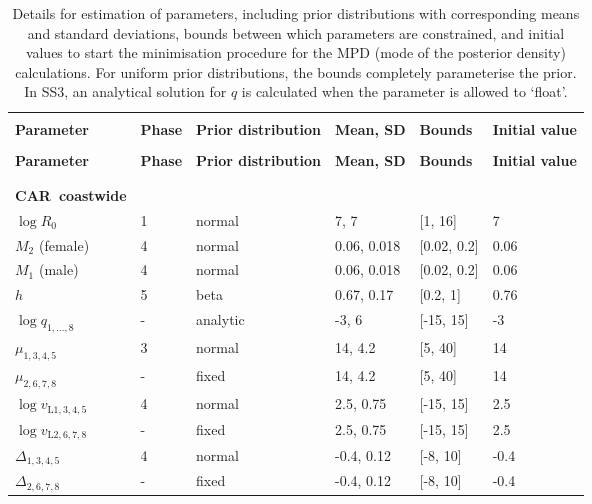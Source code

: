 \documentclass[11pt]{book}
\def\bfTh{{\bf \Theta}}%
\newcommand{\comment}[1]{}                    %
\def\bfTh{{\bf \Theta}}          %
\newcommand{\eref}[1]{(\ref{#1})}
\begin{document}

\begin{longtable}{L{1.2in}C{1.0in}C{1.0in}C{1.0in}C{1.0in}C{1.2in}}
\caption{Details for estimation of parameters, including prior distributions with corresponding means and standard deviations, bounds between which parameters are constrained, and initial values to start the minimisation procedure for the MPD (mode of the posterior density) calculations. For uniform prior distributions, the bounds completely parameterise the prior. In SS3, an analytical solution for $q$ is calculated when the parameter is allowed to `float'.}
\comment{
}
\label{tab:priors}
\\ \hline\\[-2.2ex]
\textbf{Parameter} & \textbf{Phase} & \textbf{Prior distribution} & \textbf{Mean, SD} & \textbf{Bounds} & \textbf{Initial value}
\\[0.2ex]\hline\\[-1.5ex] \endfirsthead \hline 
\textbf{Parameter} & \textbf{Phase} & \textbf{Prior distribution} & \textbf{Mean, SD} & \textbf{Bounds} & \textbf{Initial value}
\\[0.2ex]\hline\\[-1.5ex] \endhead
\hline\\[-2.2ex]   \endfoot  \hline \endlastfoot  %

\textbf{CAR~coastwide} &   &          &              &             &\\
$\log R_0$                    & 1 & normal   & 7, 7         & [1, 16]     &  7\\
$M_{2}$ (female)              & 4 & normal   & 0.06, 0.018  & [0.02, 0.2] &  0.06\\
$M_{1}$ (male)                & 4 & normal   & 0.06, 0.018  & [0.02, 0.2] &  0.06\\
$h$                           & 5 & beta     & 0.67, 0.17   & [0.2, 1]    &  0.76\\
$\log q_{1,...,8}$            & - & analytic & -3,   6      & [-15, 15]   & -3\\
$\mu_{1,3,4,5}$               & 3 & normal   & 14, 4.2      & [5, 40]     & 14\\
$\mu_{2,6,7,8}$               & - & fixed    & 14, 4.2      & [5, 40]     & 14\\
$\log v_{\text{L}1,3,4,5}$    & 4 & normal   & 2.5, 0.75    & [-15, 15]   & 2.5\\
$\log v_{\text{L}2,6,7,8}$    & - & fixed    & 2.5, 0.75    & [-15, 15]   & 2.5\\
$\Delta_{1,3,4,5}$            & 4 & normal   & -0.4, 0.12   & [-8, 10]    & -0.4\\
$\Delta_{2,6,7,8}$            & - & fixed    & -0.4, 0.12   & [-8, 10]    & -0.4\\
\hline  
\end{longtable}
\end{document}
